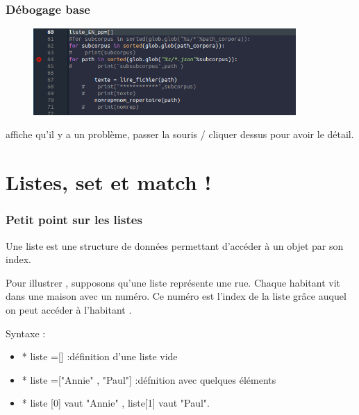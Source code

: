 \begin{frame}
  \frametitle{Débogage base}
  \begin{figure}
  \includegraphics[width=10cm]{images/spyder_signal_erreur.png}
	\end{figure} 
	 affiche qu'il y a un problème, passer la souris / cliquer dessus pour avoir le détail. 
  \end{frame}
  
\section{Listes, set et match !}

\begin{frame}
  \frametitle{Petit point sur les listes}
  Une liste est une structure de données permettant d'accéder
à un objet par son index.


Pour illustrer , supposons qu'une liste représente une rue.
Chaque habitant vit dans une maison avec un numéro.
Ce numéro est l'index de la liste grâce auquel on peut accéder
à l'habitant .


Syntaxe :
\begin{itemize}
\item* liste =[] :définition d'une liste vide
\item* liste =["Annie" , "Paul"] :défnition avec quelques éléments
\item* liste [0] vaut "Annie" , liste[1] vaut "Paul".
\end{itemize}



\end{frame}
\begin{frame}
  
\end{frame}
\begin{frame}
  
\end{frame}\begin{frame}
  
\end{frame}






